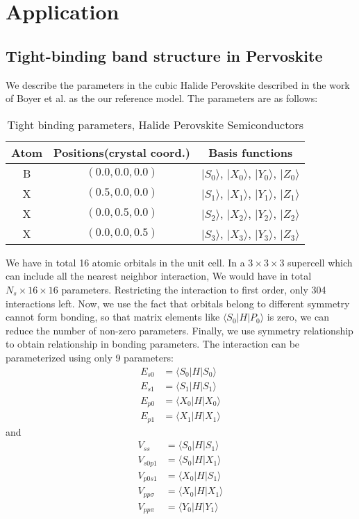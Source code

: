 \documentclass{article}
\begin{document}
\section{Application}
\subsection{Tight-binding band structure in Pervoskite}

We describe the parameters in the cubic Halide Perovskite described in 
the work of Boyer et al.\cite{boyer-richard_symmetry-based_2016} as the 
our reference model. The parameters are as follows:
\begin{table}[h]
    \centering
    \caption{Tight binding parameters, Halide Perovskite Semiconductors}
    \label{T:TBP}
    \begin{tabular}{|c|c|c|}
        \hline
        Atom & Positions(crystal coord.) & Basis functions \\
        \hline
        B & $(0.0,0.0,0.0)$ & $|S_0\rangle$, $|X_0\rangle$, $|Y_0\rangle$, $|Z_0\rangle$ \\
        X & $(0.5,0.0,0.0)$ & $|S_1\rangle$, $|X_1\rangle$, $|Y_1\rangle$, $|Z_1\rangle$ \\
        X & $(0.0,0.5,0.0)$ & $|S_2\rangle$, $|X_2\rangle$, $|Y_2\rangle$, $|Z_2\rangle$ \\
        X & $(0.0,0.0,0.5)$ & $|S_3\rangle$, $|X_3\rangle$, $|Y_3\rangle$, $|Z_3\rangle$ \\
        \hline
    \end{tabular}
\end{table}
We have in total 16 atomic orbitals in the unit cell. In a $3\times 3\times 3$ supercell
which can include all the nearest neighbor interaction, We would have in total $N_s \times 16 \times 16$ parameters. 
Restricting the interaction to first order, only 304 interactions left. 
Now, we use the fact that orbitals belong to different symmetry cannot form bonding, 
so that matrix elements like $\langle S_0 | H | P_0 \rangle$ is zero, we can reduce the 
number of non-zero parameters. 
Finally, we use symmetry relationship to obtain relationship in bonding parameters. 
The interaction can be parameterized using only 9 parameters:
\begin{align*}
    E_{s0} &= \langle S_0 | H | S_0 \rangle \\
    E_{s1} &= \langle S_1 | H | S_1 \rangle \\
    E_{p0} &= \langle X_0 | H | X_0 \rangle \\
    E_{p1} &= \langle X_1 | H | X_1 \rangle 
\end{align*}
and 
\begin{align*}
    V_{ss} &= \langle S_0 | H | S_1 \rangle  \\
    V_{s0p1} &= \langle S_0 | H | X_1 \rangle \\
    V_{p0s1} &= \langle X_0 | H | S_1 \rangle \\
    V_{pp\sigma} &= \langle X_0 | H | X_1 \rangle \\
    V_{pp\pi} &= \langle Y_0 | H | Y_1 \rangle \\
\end{align*}
\end{document}
